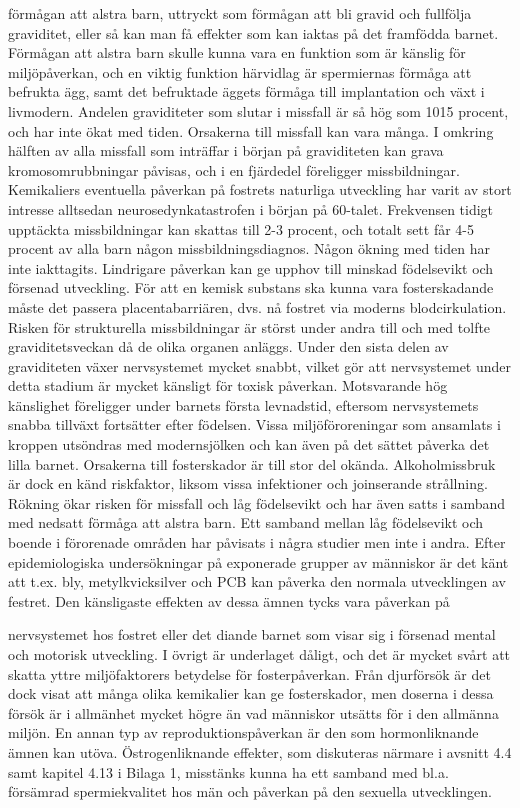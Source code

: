 förmågan att alstra barn, uttryckt som förmågan att bli gravid och fullfölja graviditet, eller så kan man få effekter som kan iaktas på det framfödda barnet. Förmågan att alstra barn skulle kunna vara en funktion som är känslig för miljöpåverkan, och en viktig funktion härvidlag är spermiernas förmåga att befrukta ägg, samt det befruktade äggets förmåga till implantation och växt i livmodern.
Andelen graviditeter som slutar i missfall är så hög som 1015 procent, och har inte ökat med tiden. Orsakerna till missfall kan vara många. I omkring hälften av alla missfall som inträffar i början på graviditeten kan grava kromosomrubbningar påvisas, och i en fjärdedel föreligger missbildningar.
Kemikaliers eventuella påverkan på fostrets naturliga utveckling har varit av stort intresse alltsedan neurosedynkatastrofen i början på 60-talet. Frekvensen tidigt upptäckta missbildningar kan skattas till 2-3 procent, och totalt sett får 4-5 procent av alla barn någon missbildningsdiagnos. Någon ökning med tiden har inte iakttagits. Lindrigare påverkan kan ge upphov till minskad födelsevikt och försenad utveckling.
För att en kemisk substans ska kunna vara fosterskadande måste det passera placentabarriären, dvs. nå fostret via moderns blodcirkulation. Risken för strukturella missbildningar är störst under andra till och med tolfte graviditetsveckan då de olika organen anläggs. Under den sista delen av graviditeten växer nervsystemet mycket snabbt, vilket gör att nervsystemet under detta stadium är mycket känsligt för toxisk påverkan. Motsvarande hög känslighet föreligger under barnets första levnadstid, eftersom nervsystemets snabba tillväxt fortsätter efter födelsen. Vissa miljöföroreningar som ansamlats i kroppen utsöndras med modernsjölken och kan även på det sättet påverka det lilla barnet.
Orsakerna till fosterskador är till stor del okända. Alkoholmissbruk är dock en känd riskfaktor, liksom vissa infektioner och joinserande strållning. Rökning ökar risken för missfall och låg födelsevikt och har även satts i samband med nedsatt förmåga att alstra barn. Ett samband mellan låg födelsevikt och boende i förorenade områden har påvisats i några studier men inte i andra.
Efter epidemiologiska undersökningar på exponerade grupper av människor är det känt att t.ex. bly, metylkvicksilver och PCB kan påverka den normala utvecklingen av festret. Den känsligaste effekten av dessa ämnen tycks vara påverkan på

nervsystemet hos fostret eller det diande barnet som visar sig i försenad mental och motorisk utveckling. I övrigt är underlaget dåligt, och det är mycket svårt att skatta yttre miljöfaktorers betydelse för fosterpåverkan. Från djurförsök är det dock visat att många olika kemikalier kan ge fosterskador, men doserna i dessa försök är i allmänhet mycket högre än vad människor utsätts för i den allmänna miljön.
En annan typ av reproduktionspåverkan är den som hormonliknande ämnen kan utöva. Östrogenliknande effekter, som diskuteras närmare i avsnitt 4.4 samt kapitel 4.13 i Bilaga 1, misstänks kunna ha ett samband med bl.a. försämrad spermiekvalitet hos män och påverkan på den sexuella utvecklingen.
